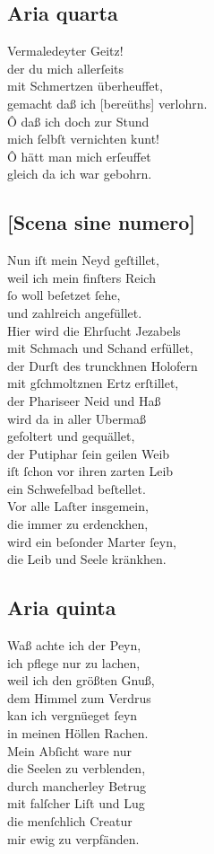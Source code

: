 \documentclass{ees}
\newenvironment{lyrics}[1]{%
  \subsection{#1}\nopagebreak%
  \begin{lyricslist}%
  \let\voice\item%
}{%
  \end{lyricslist}%
}
\begin{document}
\begin{lyrics}{Aria quarta}
  \voice[Judas]
  Vermaledeyter Geitz!\\
  der du mich allerſeits\\
  mit Schmertzen überheuffet,\\
  gemacht daß ich [bereüths] verlohrn.\\[1ex]
  Ô daß ich doch zur Stund\\
  mich ſelbſt vernichten kunt!\\
  Ô hätt man mich erſeuffet\\
  gleich da ich war gebohrn.
\end{lyrics}

\begin{lyrics}{[Scena sine numero]}
  \voice[Lucifer]
  Nun iſt mein Neyd geſtillet,\\
  weil ich mein finſters Reich\\
  ſo woll beſetzet ſehe,\\
  und zahlreich angefüllet.\\
  Hier wird die Ehrſucht Jezabels\\
  mit Schmach und Schand erfüllet,\\
  der Durſt des trunckhnen Holofern\\
  mit gſchmoltznen Ertz erſtillet,\\
  der Phariseer Neid und Haß\\
  wird da in aller Ubermaß\\
  gefoltert und gequället,\\
  der Putiphar ſein geilen Weib\\
  iſt ſchon vor ihren zarten Leib\\
  ein Schwefelbad beſtellet.\\
  Vor alle Laſter insgemein,\\
  die immer zu erdenckhen,\\
  wird ein beſonder Marter ſeyn,\\
  die Leib und Seele kränkhen.
\end{lyrics}

\begin{lyrics}{Aria quinta}
  \voice[Lucifer]
  Waß achte ich der Peyn,\\
  ich pflege nur zu lachen,\\
  weil ich den größten Gnuß,\\
  dem Himmel zum Verdrus\\
  kan ich vergnüeget ſeyn\\
  in meinen Höllen Rachen.\\[1ex]
  Mein Abſicht ware nur\\
  die Seelen zu verblenden,\\
  durch mancherley Betrug\\
  mit falſcher Liſt und Lug\\
  die menſchlich Creatur\\
  mir ewig zu verpfänden.
\end{lyrics}
\end{document}
